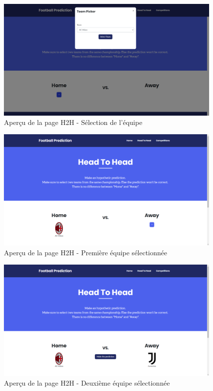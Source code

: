 \documentclass[a4paper,14pt]{extarticle}
\begin{document}
{\begin{figure}[htp]
    \centering
    \includegraphics[width=30em]{../img/teamPickerH2H.png}
    \caption{Aperçu de la page H2H - Sélection de l'équipe}
    \label{fig:teamPickerH2H}
\end{figure}

\begin{figure}[htp]
    \centering
    \includegraphics[width=30em]{../img/teamSelectedH2H.png}
    \caption{Aperçu de la page H2H - Première équipe sélectionnée}
    \label{fig:teamSelectedH2H}
\end{figure}

\begin{figure}[htp]
    \centering
    \includegraphics[width=30em]{../img/teamsSelectedH2H.png}
    \caption{Aperçu de la page H2H - Deuxième équipe sélectionnée}
    \label{fig:teamsSelectedH2H}
\end{figure}

}
\end{document}
